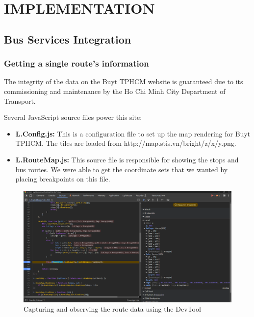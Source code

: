 %
%
\section{IMPLEMENTATION}

\subsection{Bus Services Integration}

\subsubsection{Getting a single route's information}

The integrity of the data on the Buyt TPHCM website is guaranteed due to its commissioning and maintenance by the Ho Chi Minh City Department of Transport. 

Several JavaScript source files power this site:
\begin{itemize}
    \item \textbf{L.Config.js:} This is a configuration file to set up the map rendering for Buyt TPHCM. The tiles are loaded from http://map.stis.vn/bright/{z}/{x}/{y}.png.
    \item \textbf{L.RouteMap.js:} This source file is responsible for showing the stops and bus routes. We were able to get the coordinate sets that we wanted by placing breakpoints on this file.
\end{itemize}

\begin{figure}[H]
    \includegraphics[width=\textwidth]{assets/images/Research/Bus/lat_long_web.png}
    \caption{Capturing and observing the route data using the DevTool}
    \label{fig:lat_long_web}
\end{figure}

